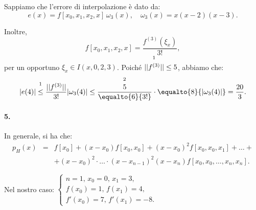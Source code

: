  Sappiamo che l'errore di interpolazione è dato da:
\begin{equation*}
    e(x)=f[x_0,x_1,x_2,x]\,\omega_3(x),\quad \omega_3(x)=x(x-2)(x-3).
\end{equation*}

\noindent Inoltre,
\begin{equation*}
    f[x_0,x_1,x_2,x]=\frac{f^{(3)}(\xi_x)}{3!},
\end{equation*}
per un opportuno $\xi_x\in I(x,0,2,3)$. Poiché $\overset{\footnotemark}{||f^{(3)}||}\leq 5$, abbiamo che:
\begin{equation*}
    |e(4)|\overset{\footnotemark}{\leq}\frac{||f^{(3)}||}{3!}|\omega_3(4)|\leq\frac{\overset{\footnotemark}{5}}{\equalto{6}{3!}}\cdot \equalto{8}{|\omega_3(4)|}=\frac{20}{3}.
\end{equation*}
\addtocounter{footnote}{-2}



\paragraph{5.} In generale, si ha che:
\begin{equation*}
    \begin{matrix}
        p_H(x)&=&f[x_0]+(x-x_0)f[x_0,x_0]+(x-x_0)^2f[x_0,x_0,x_1] + \hdots +\\
        && + (x-x_0)^2\cdot\hdots\cdot (x-x_{n-1})^2(x-x_n)f[x_0,x_0,\hdots,x_n,x_n].
    \end{matrix}
\end{equation*}

\noindent Nel nostro caso:
$\begin{cases}
    n=1,\, x_0=0,\, x_1=3,\\
    f(x_0)=1,\, f(x_1)=4,\\
    f'(x_0)=7,\, f'(x_1)=-8.
\end{cases}$

